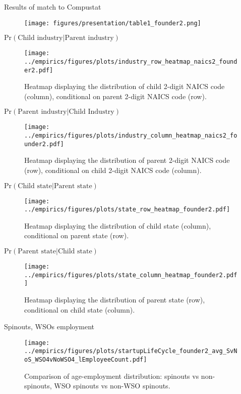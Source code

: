 \documentclass[english,usenames,dvipsnames]{beamer}
\begin{document}
\begin{frame}{Results of match to Compustat}
\begin{figure}
	\texttt{[image: figures/presentation/table1\_founder2.png]}
\end{figure}
\end{frame}

\begin{frame}{$\mathrm{Pr}(\textrm{Child industry} | \textrm{Parent industry})$}
\begin{figure}
	\texttt{[image: ../empirics/figures/plots/industry\_row\_heatmap\_naics2\_founder2.pdf]}
	\caption{\footnotesize Heatmap displaying the distribution of child 2-digit NAICS code (column), conditional on parent 2-digit NAICS code (row).}
\end{figure}
\end{frame}

\begin{frame}{$\mathrm{Pr}(\textrm{Parent industry} | \textrm{Child Industry})$}
\begin{figure}
	\texttt{[image: ../empirics/figures/plots/industry\_column\_heatmap\_naics2\_founder2.pdf]}
	\caption{\footnotesize Heatmap displaying the distribution of parent 2-digit NAICS code (row), conditional on child 2-digit NAICS code (column).}
\end{figure}
\end{frame}

\begin{frame}{$\mathrm{Pr}(\textrm{Child state} | \textrm{Parent state})$}
\begin{figure}
	\texttt{[image: ../empirics/figures/plots/state\_row\_heatmap\_founder2.pdf]}
	\caption{\footnotesize Heatmap displaying the distribution of child state (column), conditional on parent state (row).}
\end{figure}
\end{frame}

\begin{frame}{$\mathrm{Pr}(\textrm{Parent state} | \textrm{Child state})$}
\begin{figure}
\texttt{[image: ../empirics/figures/plots/state\_column\_heatmap\_founder2.pdf]}
\caption{\footnotesize Heatmap displaying the distribution of parent state (row), conditional on child state (column).}
\end{figure}
\end{frame}

\begin{frame}{Spinouts, WSOs employment}
	\begin{figure}
		\centering
		\texttt{[image: ../empirics/figures/plots/startupLifeCycle\_founder2\_avg\_SvNoS\_WSO4vNoWSO4\_lEmployeeCount.pdf]}
		\caption{Comparison of age-employment distribution: spinouts vs non-spinouts, WSO spinouts vs non-WSO spinouts.}
	\end{figure}
\end{frame}
\end{document}
